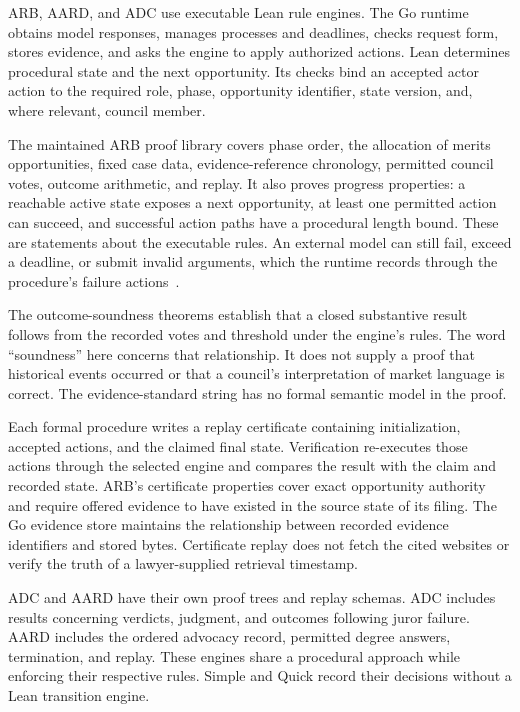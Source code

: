 \documentclass[11pt]{article}
\begin{document}
ARB, AARD, and ADC use executable Lean rule engines.  The Go runtime obtains model responses, manages processes and deadlines, checks request form, stores evidence, and asks the engine to apply authorized actions.  Lean determines procedural state and the next opportunity.  Its checks bind an accepted actor action to the required role, phase, opportunity identifier, state version, and, where relevant, council member.

The maintained ARB proof library covers phase order, the allocation of merits opportunities, fixed case data, evidence-reference chronology, permitted council votes, outcome arithmetic, and replay.  It also proves progress properties: a reachable active state exposes a next opportunity, at least one permitted action can succeed, and successful action paths have a procedural length bound.  These are statements about the executable rules.  An external model can still fail, exceed a deadline, or submit invalid arguments, which the runtime records through the procedure's failure actions~\cite{proofs}.

The outcome-soundness theorems establish that a closed substantive result follows from the recorded votes and threshold under the engine's rules.  The word ``soundness'' here concerns that relationship.  It does not supply a proof that historical events occurred or that a council's interpretation of market language is correct.  The evidence-standard string has no formal semantic model in the proof.

Each formal procedure writes a replay certificate containing initialization, accepted actions, and the claimed final state.  Verification re-executes those actions through the selected engine and compares the result with the claim and recorded state.  ARB's certificate properties cover exact opportunity authority and require offered evidence to have existed in the source state of its filing.  The Go evidence store maintains the relationship between recorded evidence identifiers and stored bytes.  Certificate replay does not fetch the cited websites or verify the truth of a lawyer-supplied retrieval timestamp.

ADC and AARD have their own proof trees and replay schemas.  ADC includes results concerning verdicts, judgment, and outcomes following juror failure.  AARD includes the ordered advocacy record, permitted degree answers, termination, and replay.  These engines share a procedural approach while enforcing their respective rules.  Simple and Quick record their decisions without a Lean transition engine.
\end{document}
